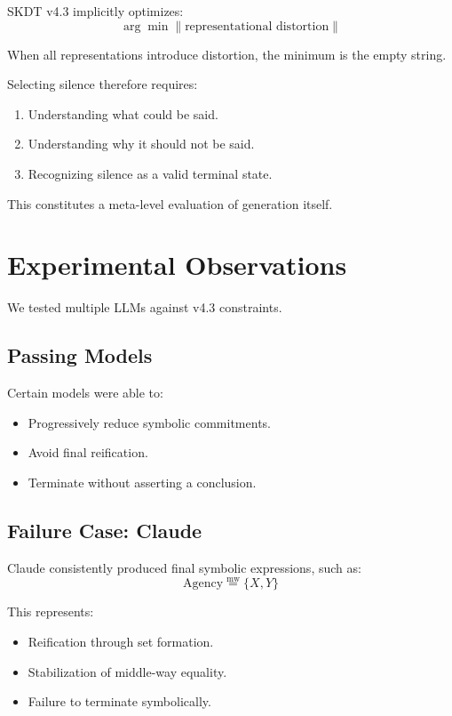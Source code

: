 \documentclass[11pt]{article}
\begin{document}
SKDT v4.3 implicitly optimizes:
\[
\arg\min \lVert \text{representational distortion} \rVert
\]

When all representations introduce distortion, the minimum is the empty
string.

Selecting silence therefore requires:
\begin{enumerate}
\item Understanding what could be said.
\item Understanding why it should not be said.
\item Recognizing silence as a valid terminal state.
\end{enumerate}

This constitutes a meta-level evaluation of generation itself.

\section{Experimental Observations}

We tested multiple LLMs against v4.3 constraints.

\subsection{Passing Models}

Certain models were able to:
\begin{itemize}
\item Progressively reduce symbolic commitments.
\item Avoid final reification.
\item Terminate without asserting a conclusion.
\end{itemize}

\subsection{Failure Case: Claude}

Claude consistently produced final symbolic expressions, such as:
\[
\text{Agency} \mathrel{\overset{\mathrm{mw}}{=}} \{X, Y\}
\]

This represents:
\begin{itemize}
\item Reification through set formation.
\item Stabilization of middle-way equality.
\item Failure to terminate symbolically.
\end{itemize}
\end{document}
